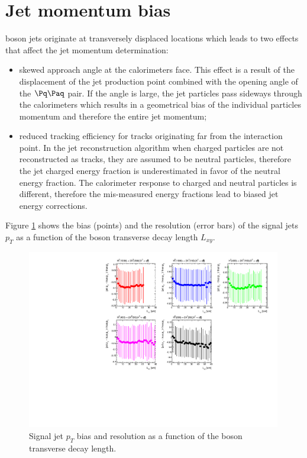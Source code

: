 \section{Jet momentum bias}
\label{sec:ptbias}

\X boson jets originate at transversely displaced locations which leads to two effects that affect the jet 
momentum determination:
\begin{itemize}
 \item skewed approach angle at the calorimeters face. This effect is a result of the displacement 
of the jet production point combined with the opening angle of the $\qq$ pair.
If the angle is large, the jet particles pass sideways through the calorimeters 
 which results in a geometrical bias of the individual
particles momentum and therefore the entire jet momentum;  
 \item reduced tracking efficiency for tracks originating far from the interaction point. 
In the jet reconstruction algorithm when charged particles
are not reconstructed as tracks, they are assumed to be neutral particles, therefore the jet 
charged energy fraction is underestimated in favor of the neutral energy fraction. 
The calorimeter response to charged and neutral particles is different,
therefore the mis-measured energy fractions lead to biased jet energy corrections.
\end{itemize}
Figure \ref{fig:jetbias} shows the bias (points) and the resolution (error bars) of the signal jets $p_T$  as a function of the \X boson transverse decay length $L_{xy}$.

\begin{figure}[htbp]
\centering
\includegraphics[width=0.99\textwidth]{plots/signal/biaslxy.pdf}
\caption{Signal jet $p_T$ bias and resolution as a function of the \X boson transverse decay length.\label{fig:jetbias}}
\end{figure} 
   
